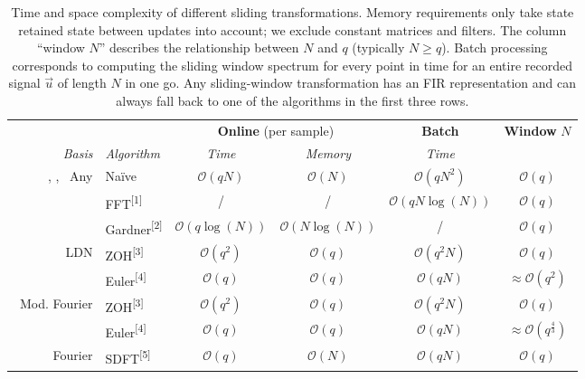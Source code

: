 \begin{table}[p]
	\caption[Time and space complexity of different sliding transformations]{Time and space complexity of different sliding transformations.
	Memory requirements only take state retained state between updates into account; we exclude constant matrices and filters.
	The column \enquote{window $N$} describes the relationship between $N$ and $q$ (typically $N \geq q$).
	Batch processing corresponds to computing the sliding window spectrum for every point in time for an entire recorded signal $\vec u$ of length $N$ in one go.
	Any sliding-window transformation has an FIR representation and can always fall back to one of the algorithms in the first three rows.
	}
	\label{tbl:time_comparison}
	\small\sffamily
	{
	\centering
	\setlength{\tabcolsep}{8.75pt}
	\begin{tabular}{r l c c c c}
		\toprule
		& & \multicolumn{2}{c}{\textbf{Online} (per sample)} & \multicolumn{1}{c}{\textbf{Batch}} & \textbf{Window} $N$ \\
		\cmidrule(r){3-4}\cmidrule(r){5-5}\cmidrule{6-6}
		\emph{Basis} & \emph{Algorithm} & \emph{Time} & \emph{Memory} & \emph{Time} & \\
		\midrule
		\symLTI, \symSDT, \symFIR~Any & Na\"ive & $\mathcal{O}(qN)$ & $\mathcal{O}(N)$ & $\mathcal{O}(qN^2)$ & $\mathcal{O}(q)$ \\
		\cmidrule{2-6}
		    & FFT\textsuperscript{[1]} & / & / & $\mathcal{O}(qN \log(N))$ & $\mathcal{O}(q)$  \\
		\cmidrule{2-6}
		    & Gardner\textsuperscript{[2]} & $\mathcal{O}(q \log(N))$ & $\mathcal{O}(N \log(N))$ & / & $\mathcal{O}(q)$ \\
		\midrule
		\symLTI~LDN &
			ZOH\textsuperscript{[3]} & $\mathcal{O}(q^2)$ & $\mathcal{O}(q)$ & $\mathcal{O}(q^2 N)$ & $\mathcal{O}(q)$ \\
		\cmidrule{2-6}
		& Euler\textsuperscript{[4]} & $\mathcal{O}(q)$ & $\mathcal{O}(q)$ & $\mathcal{O}(qN)$ & $\approx \mathcal{O}(q^2)$ \\
		\midrule
		\symLTI~Mod. Fourier &
			ZOH\textsuperscript{[3]} & $\mathcal{O}(q^2)$ & $\mathcal{O}(q)$ & $\mathcal{O}(q^2N)$ & $\mathcal{O}(q)$ \\
		\cmidrule{2-6}
		& Euler\textsuperscript{[4]} & $\mathcal{O}(q)$ & $\mathcal{O}(q)$ & $\mathcal{O}(qN)$ & $\approx \mathcal{O}(q^{\frac{4}3})$ \\
		\midrule
		\symSDT~Fourier & SDFT\textsuperscript{[5]} & $\mathcal{O}(q)$ & $\mathcal{O}(N)$ & $\mathcal{O}(qN)$ & $\mathcal{O}(q)$ \\

\end{tabular}}
\end{table}
